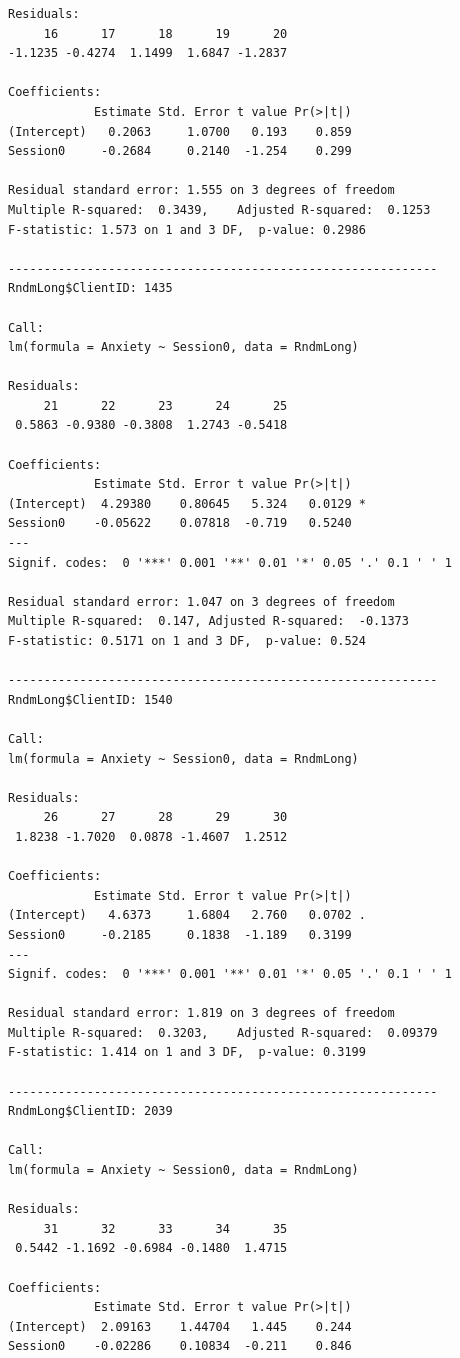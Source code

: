 \documentclass[
  english,
]{book}
\begin{document}
\begin{verbatim}
Residuals:
     16      17      18      19      20 
-1.1235 -0.4274  1.1499  1.6847 -1.2837 

Coefficients:
            Estimate Std. Error t value Pr(>|t|)
(Intercept)   0.2063     1.0700   0.193    0.859
Session0     -0.2684     0.2140  -1.254    0.299

Residual standard error: 1.555 on 3 degrees of freedom
Multiple R-squared:  0.3439,    Adjusted R-squared:  0.1253 
F-statistic: 1.573 on 1 and 3 DF,  p-value: 0.2986

------------------------------------------------------------ 
RndmLong$ClientID: 1435

Call:
lm(formula = Anxiety ~ Session0, data = RndmLong)

Residuals:
     21      22      23      24      25 
 0.5863 -0.9380 -0.3808  1.2743 -0.5418 

Coefficients:
            Estimate Std. Error t value Pr(>|t|)  
(Intercept)  4.29380    0.80645   5.324   0.0129 *
Session0    -0.05622    0.07818  -0.719   0.5240  
---
Signif. codes:  0 '***' 0.001 '**' 0.01 '*' 0.05 '.' 0.1 ' ' 1

Residual standard error: 1.047 on 3 degrees of freedom
Multiple R-squared:  0.147, Adjusted R-squared:  -0.1373 
F-statistic: 0.5171 on 1 and 3 DF,  p-value: 0.524

------------------------------------------------------------ 
RndmLong$ClientID: 1540

Call:
lm(formula = Anxiety ~ Session0, data = RndmLong)

Residuals:
     26      27      28      29      30 
 1.8238 -1.7020  0.0878 -1.4607  1.2512 

Coefficients:
            Estimate Std. Error t value Pr(>|t|)  
(Intercept)   4.6373     1.6804   2.760   0.0702 .
Session0     -0.2185     0.1838  -1.189   0.3199  
---
Signif. codes:  0 '***' 0.001 '**' 0.01 '*' 0.05 '.' 0.1 ' ' 1

Residual standard error: 1.819 on 3 degrees of freedom
Multiple R-squared:  0.3203,    Adjusted R-squared:  0.09379 
F-statistic: 1.414 on 1 and 3 DF,  p-value: 0.3199

------------------------------------------------------------ 
RndmLong$ClientID: 2039

Call:
lm(formula = Anxiety ~ Session0, data = RndmLong)

Residuals:
     31      32      33      34      35 
 0.5442 -1.1692 -0.6984 -0.1480  1.4715 

Coefficients:
            Estimate Std. Error t value Pr(>|t|)
(Intercept)  2.09163    1.44704   1.445    0.244
Session0    -0.02286    0.10834  -0.211    0.846


\end{verbatim}
\end{document}

